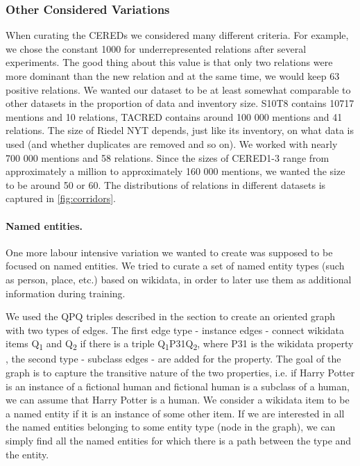 \subsubsection{Other Considered Variations}
When curating the CEREDs we considered many different criteria. For example, we chose the constant 1000 for underrepresented relations after several experiments. The good thing about this value is that only two relations were more dominant than the new  relation and at the same time, we would keep 63 positive relations. We wanted our dataset to be at least somewhat comparable to other datasets in the proportion of data and inventory size. S10T8 contains 10717 mentions and 10 relations, TACRED contains around 100 000 mentions and 41 relations. The size of Riedel NYT depends, just like its inventory, on what data is used (and whether duplicates are removed and so on). We worked with nearly 700 000 mentions and 58 relations. Since the sizes of CERED1-3 range from approximately a million to approximately 160 000 mentions, we wanted the size to be around 50 or 60. The distributions of relations in different datasets is captured in \autoref{fig:corridors}.

\paragraph{Named entities.}

One more labour intensive variation we wanted to create was supposed to be focused on named entities. We tried to curate a set of named entity types (such as person, place, etc.) based on wikidata, in order to later use them as additional information during training. 

We used the QPQ triples described in the  section to create an oriented graph with two types of edges. The first edge type - instance edges - connect wikidata items Q\textsubscript{1} and Q\textsubscript{2} if there is a triple Q\textsubscript{1}P31Q\textsubscript{2}, where P31 is the wikidata property , the second type - subclass edges - are added for the  property. The goal of the graph is to capture the transitive nature of the two properties, i.e. if Harry Potter is an instance of a fictional human and fictional human is a subclass of a human, we can assume that Harry Potter is a human. We consider a wikidata item to be a named entity if it is an instance of some other item. If we are interested in all the named entities belonging to some entity type (node in the graph), we can simply find all the named entities for which there is a path between the type and the entity.

